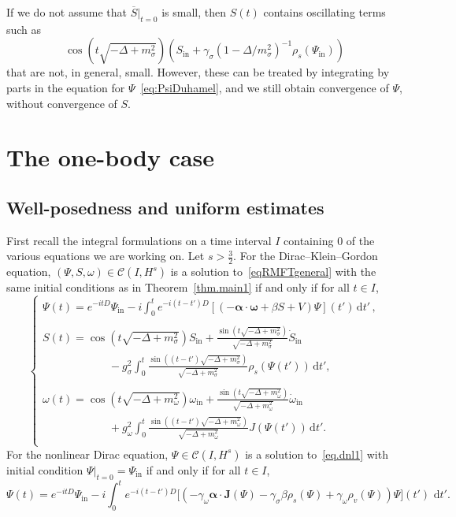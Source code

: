 \documentclass[10pt]{amsart}
\theoremstyle{definition}\newtheorem{defi}[theo]{Definition}\newtheorem{rema}[theo]{Remark}\newtheorem{exam}[theo]{Example}\newtheorem{exem}[theo]{Example}\newtheorem{nota}[theo]{Notation}
\newcommand{\rmin}{\mathrm{in}}
\newcommand{\cC}{\mathcal{C}}
\renewcommand\d[1]{{\ensuremath{\,\text{d}#1}}}
\newcommand{\dps}{\displaystyle}
\begin{document}
If we do not assume that $\overline{S}\vert_{t=0}$ is small, then $S(t)$ contains oscillating terms such as
\begin{equation}
\cos \left(t\sqrt{-\Delta+m_\sigma^2}\right)\left(S_\rmin+\gamma_\sigma\left(1-\Delta/m_\sigma^2\right)^{-1}\rho_s(\Psi_\rmin)\right)
\end{equation}
that are not, in general, small. However, these can be treated by integrating by parts in the equation for $\Psi$~\eqref{eq:PsiDuhamel}, and we still obtain convergence of $\Psi$, without convergence of $S$.



\section{The one-body case}\label{sect:one-body}

\subsection{Well-posedness and uniform estimates}\label{sect:exist}

First recall the integral formulations on a time interval $I$ containing $0$ of the various equations we are working on. Let $s>\tfrac32$. For the Dirac--Klein--Gordon equation, $(\Psi,S,\omega)\in\cC(I,H^s)$ is a solution to~\eqref{eqRMFTgeneral} with the same initial conditions as in Theorem~\ref{thm.main1} if and only if for all $t\in I$,
\begin{equation}
\begin{cases}\label{eq:dkg-int}
\dps\Psi(t) = e^{-itD}\Psi_\rmin -i\int_0^te^{-i(t-t')D}\left[(-\bm \alpha \cdot \bm \omega +\beta S+V)\Psi\right](t')
\d t'\,,
\\
\\
\dps S(t)=
\cos\left(t\sqrt{-\Delta + m^2_\sigma}\right) S_\rmin + \frac{\sin\left(t\sqrt{-\Delta + m^2_\sigma}\right)}{\sqrt{-\Delta + m^2_\sigma}}\dot{S}_\rmin
\\\dps\qquad\qquad\qquad -g_\sigma^2\int_0^t\frac{\sin\left((t-t')\sqrt{-\Delta + m^2_\sigma}\right)}{\sqrt{-\Delta + m^2_\sigma}}\rho_s(\Psi(t'))\d t',\\
\\
\dps\omega(t)=
\cos\left(t\sqrt{-\Delta + m^2_\omega}\right)\omega_\rmin + \frac{\sin\left(t\sqrt{-\Delta + m^2_\omega}\right)}{\sqrt{-\Delta + m^2_\omega}}\dot{\omega}_\rmin
\\\dps\qquad\qquad\qquad +g_\omega^2\int_0^t\frac{\sin\left((t-t')\sqrt{-\Delta + m^2_\omega}\right)}{\sqrt{-\Delta + m^2_\omega}}J(\Psi(t')) \d t'.\\
\end{cases}
\end{equation}
For the nonlinear Dirac equation, $\Psi\in\cC(I,H^s)$ is a solution to~\eqref{eq.dnl1} with initial condition $\Psi\vert_{t=0}=\Psi_{\rmin}$ if and only if for all $t\in I$,
\begin{equation}\label{eq:dnl-int}
\Psi(t) = e^{-itD}\Psi_\rmin -i\int_0^te^{-i(t-t')D}\big[(-\gamma_\omega\bm \alpha\cdot {\bm J}(\Psi) - \gamma_\sigma\beta\rho_s(\Psi)+\gamma_\omega\rho_v(\Psi))\Psi\big](t')\,\d t'.
\end{equation}
\end{document}
